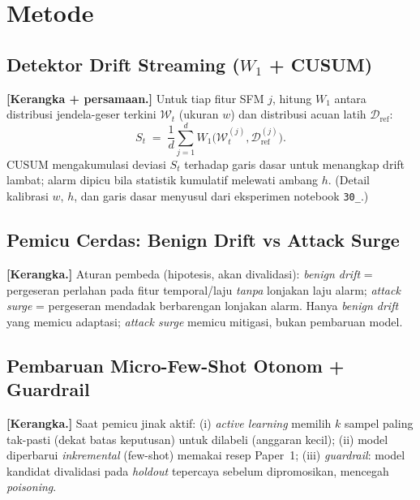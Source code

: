 \documentclass[11pt,a4paper]{article}
\begin{document}
\section{Metode}
\label{sec:method}

\subsection{Detektor Drift Streaming ($W_1$ + CUSUM)}
\label{sec:detector}
\textbf{[Kerangka + persamaan.]} Untuk tiap fitur SFM $j$, hitung $W_1$ antara
distribusi jendela-geser terkini $\mathcal{W}_t$ (ukuran $w$) dan distribusi
acuan latih $\mathcal{D}_{\text{ref}}$:
\begin{equation}
\label{eq:driftscore}
S_t \;=\; \frac{1}{d}\sum_{j=1}^{d} W_1\!\big(\mathcal{W}_t^{(j)}, \mathcal{D}_{\text{ref}}^{(j)}\big).
\end{equation}
CUSUM mengakumulasi deviasi $S_t$ terhadap garis dasar untuk menangkap drift
lambat; alarm dipicu bila statistik kumulatif melewati ambang $h$. (Detail
kalibrasi $w$, $h$, dan garis dasar menyusul dari eksperimen notebook \texttt{30\_}.)

\subsection{Pemicu Cerdas: Benign Drift vs Attack Surge}
\label{sec:trigger}
\textbf{[Kerangka.]} Aturan pembeda (hipotesis, akan divalidasi): \emph{benign
drift} = pergeseran perlahan pada fitur temporal/laju \emph{tanpa} lonjakan laju
alarm; \emph{attack surge} = pergeseran mendadak berbarengan lonjakan alarm.
Hanya \emph{benign drift} yang memicu adaptasi; \emph{attack surge} memicu
mitigasi, bukan pembaruan model.

\subsection{Pembaruan Micro-Few-Shot Otonom + Guardrail}
\label{sec:update}
\textbf{[Kerangka.]} Saat pemicu jinak aktif: (i) \emph{active learning} memilih
$k$ sampel paling tak-pasti (dekat batas keputusan) untuk dilabeli (anggaran
kecil); (ii) model diperbarui \emph{inkremental} (few-shot) memakai resep Paper~1;
(iii) \emph{guardrail}: model kandidat divalidasi pada \emph{holdout} tepercaya
sebelum dipromosikan, mencegah \emph{poisoning}.

\end{document}
